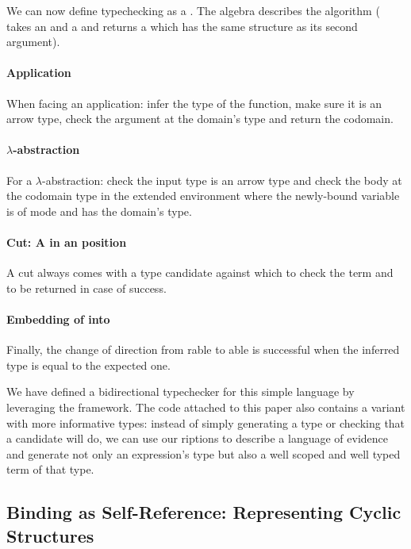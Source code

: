 We can now define typechecking as a \semrec{}. The algebra describes the
algorithm (\AF{\_<\$\_} takes an  and a { } and returns
a { } which has the same structure as its second argument).

\paragraph{Application} When facing an application: infer the type of the function,
make sure it is an arrow type, check the argument at the domain's type and return
the codomain.
\paragraph{$\lambda$-abstraction} For a $\lambda$-abstraction: check the input
type is an arrow type and check the body at the codomain type in the extended
environment where the newly-bound variable is of mode  and has the
domain's type.
\paragraph{Cut: A  in an  position} A cut always comes
with a type candidate against which to check the term and to be returned in
case of success.
\paragraph{Embedding of  into } Finally, the change of
direction from rable to able is successful when the
inferred type is equal to the expected one.

We have defined a bidirectional typechecker for
this simple language by leveraging the \semrec{}framework. The code attached
to this paper also contains a variant with more informative types: instead of simply
generating a type or checking that a candidate will do, we can use our riptions
to describe a language of evidence and generate not only an expression's type but
also a well scoped and well typed term of that type.

\subsection{Binding as Self-Reference: Representing Cyclic Structures}\label{def:colist}

